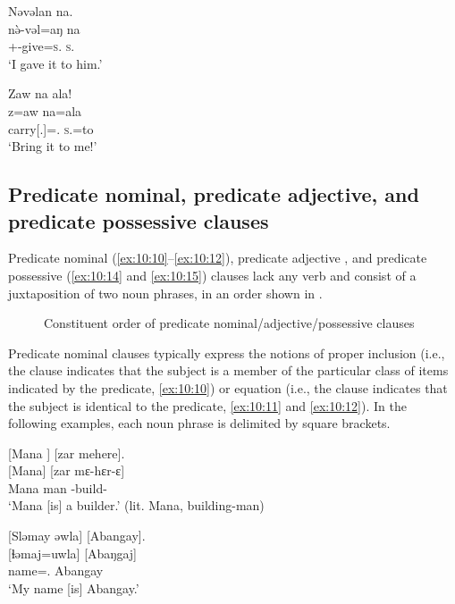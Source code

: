 \ea \label{ex:10:8}
Nəvəlan  na.\\
\gll  n\`{ə}-vəl=aŋ    na\\
      {\oneS}+{\PFV}-give=\textsc{s}.{\IO}  \textsc{s}.{\DO}\\
\glt  ‘I gave it to him.’
\z

\ea \label{ex:10:9}
Zaw  na  ala!\\
\gll  z=aw   na=ala\\
      carry[{\twoS}.{\IMP}]={\oneS}.{\IO}  \textsc{s}.{\DO}=to\\
\glt  ‘Bring it to me!’
\z

\subsection[Predicate nominal, adjective, and possessive clauses]{Predicate nominal, predicate adjective, and predicate possessive clauses}\label{sec:10.1.2}
\hypertarget{RefHeading1212881525720847}{}
Predicate nominal (\ref{ex:10:10}--\ref{ex:10:12}), predicate adjective , and predicate possessive (\ref{ex:10:14} and \ref{ex:10:15}) clauses lack any verb and consist of a juxtaposition of two noun phrases, in an order shown in .

\begin{figure}
\caption{Constituent order of predicate nominal\slash adjective\slash possessive clauses}\label{fig:17}
\end{figure}

Predicate nominal clauses typically express the notions of proper inclusion (i.e., the clause indicates that the subject is a member of the particular class of items indicated by the predicate, \ref{ex:10:10}) or equation (i.e., the clause indicates that the subject is identical to the predicate, \ref{ex:10:11} and \ref{ex:10:12}). In the following examples, each noun phrase is delimited by square brackets.

\ea \label{ex:10:10}
{} [Mana ]  [zar  mehere].\\
\gll  {}[Mana]    [zar  mɛ-hɛr-ɛ]\\
      Mana    man  {\NOM}{}-build-{\CL}\\
\glt  ‘Mana [is] a builder.’ (lit. Mana, building-man)
\z

\ea \label{ex:10:11}
{}[Sləmay  əwla]  [Abangay].\\
\gll  {}[ɬəmaj=uwla]  [Abaŋgaj]\\
      name={\oneS}.{\POSS}  Abangay\\
\glt  ‘My name [is] Abangay.’
\z

